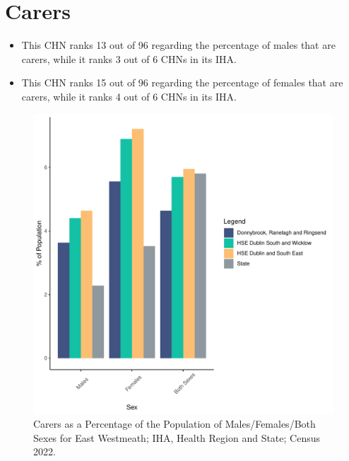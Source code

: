 \documentclass{article}
\begin{document}
\section{Carers}\label{sect:Carers}
\begin{itemize}
\item This CHN ranks  13 out of 96 regarding the percentage of males that are carers, while it ranks   3 out of 6 CHNs in its IHA.
\item This CHN ranks  15 out of 96 regarding the percentage of females that are carers, while it ranks   4 out of 6 CHNs in its IHA.
\end{itemize}
\begin{figure}[H]
	\centering
	\includegraphics[width = 150mm]{../figures/CareED.pdf}
	\caption{Carers as a Percentage of the Population of Males/Females/Both Sexes for East Westmeath; IHA, Health Region and State; Census 2022.}
	\label{fig:2ae19629-1a6a-13a3-e055-000000000001}
	\end{figure}
\end{document}
